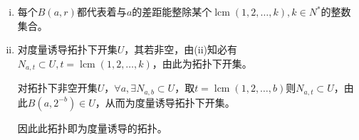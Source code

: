\documentclass[a4paper,UTF8,fontset=windows]{ctexart}
\DeclareMathOperator{\lcm}{lcm}
\begin{document}
\begin{enumerate}[(1)]
\begin{enumerate}[(a)]
\begin{enumerate}[(i)]
    \item
    每个$B(a,r)$都代表着与$a$的差距能整除某个$\lcm(1,2,\dots,k),k\in N^*$的整数集合。
    
    \item
    对度量诱导拓扑下开集$U$，其若非空，由(ii)知必有$N_{a,t}\subset U,t=\lcm(1,2,\dots,k)$，由此为拓扑下开集。
    
    对拓扑下非空开集$U$，$\forall a,\exists N_{a,b}\subset U$，取$t=\lcm(1,2,\dots,b)$则$N_{a,t}\subset U$，由此$B(a,2^{-b})\in U$，从而为度量诱导拓扑下开集。
    
    因此此拓扑即为度量诱导的拓扑。
    \end{enumerate}
    \end{enumerate}
\end{enumerate}

\subsection{}
\end{document}
